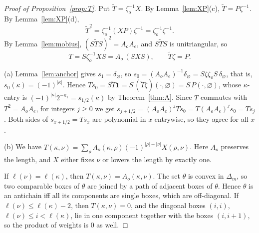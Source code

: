 \documentclass[11pt]{amsart}
\theoremstyle{definition}
\theoremstyle{remark}
\begin{document}
\begin{proof}[Proof of Proposition~\ref{prop:T}]
Put $\tilde T=\zeta_o^{-1}X$. By Lemma~\ref{lem:XP}(c), $\tilde T=P\zeta^{-1}$. By
Lemma~\ref{lem:XP}(d),
\[ \tilde T^2=\zeta_o^{-1}(XP)\zeta^{-1}=\zeta_o^{-1}\zeta^{-1}. \] By
Lemma~\ref{lem:mobius}, $(S\tilde TS)^2=A_oA_e$, and $S\tilde TS$ is unitriangular, so
\[ T=S\zeta_o^{-1}XS=A_o\,(SXS),\qquad \tilde T\zeta=P. \]

(a) Lemma~\ref{lem:anchor} gives $s_1=\delta_\varnothing$, so
$s_0=(A_oA_e)^{-1}\delta_\varnothing=S\zeta\zeta_oS\,\delta_\varnothing$, that is,
$s_0(\kappa)=(-1)^{|\kappa|}$. Hence $T s_0=S\tilde T\mathbf 1=S\,(\tilde T\zeta)(\cdot,\varnothing)
=S\,P(\cdot,\varnothing)$, whose $\kappa$-entry is $(-1)^{|\kappa|}2^{-\kappa_1}=s_{1/2}(\kappa)$
by Theorem~\ref{thm:A}. Since $T$ commutes with $T^2=A_oA_e$, for integers $j\ge0$ we get
$s_{j+1/2}=(A_oA_e)^jTs_0=T(A_oA_e)^js_0=Ts_j$. Both sides of $s_{x+1/2}=Ts_x$ are polynomial in
$x$ entrywise, so they agree for all $x$.

(b) We have $T(\kappa,\nu)=\sum_\rho A_o(\kappa,\rho)(-1)^{|\rho|-|\nu|}X(\rho,\nu)$. Here $A_o$
preserves the length, and $X$ either fixes $\nu$ or lowers the length by exactly one.

If $\ell(\nu)=\ell(\kappa)$, then $T(\kappa,\nu)=A_o(\kappa,\nu)$. The set $\theta$ is convex in
$\Delta_m$, so two comparable boxes of $\theta$ are joined by a path of adjacent boxes of
$\theta$. Hence $\theta$ is an antichain iff all its components are single boxes, which are
off-diagonal. If $\ell(\nu)\le\ell(\kappa)-2$, then $T(\kappa,\nu)=0$, and the diagonal boxes
$(i,i)$, $\ell(\nu)\le i<\ell(\kappa)$, lie in one component together with the boxes $(i,i+1)$,
so the product of weights is $0$ as well.


\end{proof}
\end{document}
